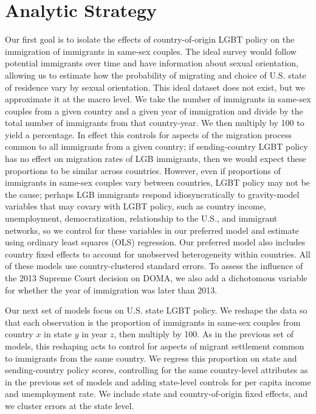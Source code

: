 \documentclass[
  11pt,
]{article}
\begin{document}
\hypertarget{analytic-strategy}{%
\section{Analytic Strategy}\label{analytic-strategy}}

Our first goal is to isolate the effects of country-of-origin LGBT policy on the immigration of immigrants in same-sex couples. The ideal survey would follow potential immigrants over time and have information about sexual orientation, allowing us to estimate how the probability of migrating and choice of U.S. state of residence vary by sexual orientation. This ideal dataset does not exist, but we approximate it at the macro level. We take the number of immigrants in same-sex couples from a given country and a given year of immigration and divide by the total number of immigrants from that country-year. We then multiply by 100 to yield a percentage. In effect this controls for aspects of the migration process common to all immigrants from a given country; if sending-country LGBT policy has no effect on migration rates of LGB immigrants, then we would expect these proportions to be similar across countries. However, even if proportions of immigrants in same-sex couples vary between countries, LGBT policy may not be the cause; perhaps LGB immigrants respond idiosyncratically to gravity-model variables that may covary with LGBT policy, such as country income, unemployment, democratization, relationship to the U.S., and immigrant networks, so we control for these variables in our preferred model and estimate using ordinary least squares (OLS) regression. Our preferred model also includes country fixed effects to account for unobserved heterogeneity within countries. All of these models use country-clustered standard errors. To assess the influence of the 2013 Supreme Court decision on DOMA, we also add a dichotomous variable for whether the year of immigration was later than 2013.

Our next set of models focus on U.S. state LGBT policy. We reshape the data so that each observation is the proportion of immigrants in same-sex couples from country \(x\) in state \(y\) in year \(z\), then multiply by 100. As in the previous set of models, this reshaping acts to control for aspects of migrant settlement common to immigrants from the same country. We regress this proportion on state and sending-country policy scores, controlling for the same country-level attributes as in the previous set of models and adding state-level controls for per capita income and unemployment rate. We include state and country-of-origin fixed effects, and we cluster errors at the state level.
\end{document}
